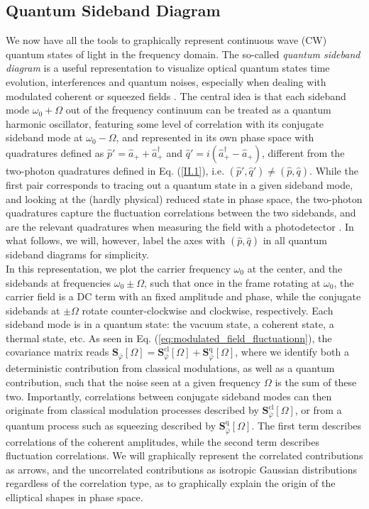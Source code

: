 \newpage
\subsection{Quantum Sideband Diagram }

We now have all the tools to graphically represent continuous wave (CW) quantum states of light in the frequency domain. The so-called \emph{quantum sideband diagram} is a useful representation to visualize optical quantum states time evolution, interferences and quantum noises, especially when dealing with modulated coherent or squeezed fields \cite{chelkowski2007,chua2013}. The central idea is that each sideband mode $\omega_0 + \Omega$ out of the frequency continuum can be treated as a quantum harmonic oscillator, featuring some level of correlation with its conjugate sideband mode at $\omega_0 - \Omega$, and represented in its own phase space with quadratures defined as $\hat{p}' = \hat{a}_+ + \hat{a}^\dagger_+$ and $ \hat{q}' = i(\hat{a}^\dagger_+ - \hat{a}_+)$, different from the two-photon quadratures defined in Eq. (\ref{II.1}), i.e. $(\hat{p}', \hat{q}') \neq (\hat{p}, \hat{q})$. While the first pair corresponds to tracing out a quantum state in a given sideband mode, and looking at the (hardly physical) reduced state in phase space, the two-photon quadratures capture the fluctuation correlations between the two sidebands, and are the relevant quadratures when measuring the field with a photodetector \cite{caves_new_1985,schumaker_new_1985}. In what follows, we will, however, label the axes with $(\hat{p}, \hat{q})$ in all quantum sideband diagrams for simplicity.\\  


In this representation, we plot the carrier frequency \(\omega_0\) at the center, and the sidebands at frequencies \(\omega_0 \pm \Omega\), such that once in the frame rotating at \(\omega_0\), the carrier field is a DC term with an fixed amplitude and phase, while the conjugate sidebands at \(\pm \Omega\) rotate counter-clockwise and clockwise, respectively. Each sideband mode is in a quantum state: the vacuum state, a coherent state, a thermal state, etc. As seen in Eq. (\ref{eq:modulated_field_fluctuationn}), the covariance matrix reads $ \mathbf S_{\bar{\varphi}}[\Omega]=  \mathbf S_{\bar{\varphi}}^{\mathrm{cl}}[\Omega] + \mathbf S_{\bar{\varphi}}^{\mathrm{q}}[\Omega]
$, where we identify both a deterministic contribution from classical modulations, as well as a quantum contribution, such that the noise seen at a given frequency $\Omega$ is the sum of these two. Importantly, correlations between conjugate sideband modes can then originate from classical modulation processes described by $\mathbf S_{\bar{\varphi}}^{\mathrm{cl}}[\Omega]$, or from a quantum process such as squeezing described by $\mathbf S_{\bar{\varphi}}^{\mathrm{q}}[\Omega]$. The first term describes correlations of the coherent amplitudes, while the second term describes fluctuation correlations. We will graphically represent the correlated contributions as arrows, and the uncorrelated contributions as isotropic Gaussian distributions regardless of the correlation type, as to graphically explain the origin of the elliptical shapes in phase space. \\  

